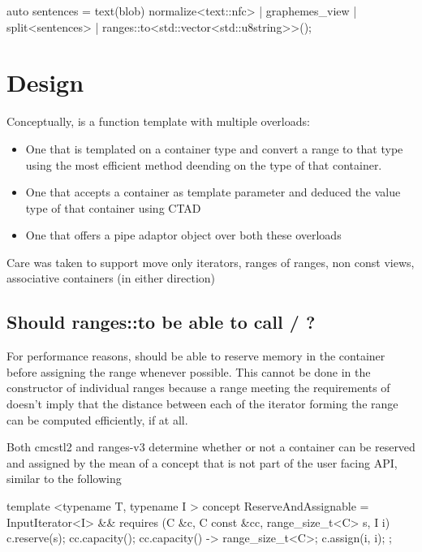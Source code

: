 \documentclass{wg21}
\begin{document}
\begin{colorblock}
    auto sentences =
        text(blob)
        normalize<text::nfc> |
        graphemes_view |
        split<sentences> | ranges::to<std::vector<std::u8string>>();
\end{colorblock}


\section{Design}

Conceptually,  is a function template with multiple overloads:
\begin{itemize}
    \item One that is templated on a container type and convert a range to that type using the most efficient method deending on the type of that container.
    \item One that accepts a container as template parameter and deduced the value type of that container using CTAD
    \item One that offers a pipe adaptor object over both these overloads
\end{itemize}

Care was taken to support move only iterators, ranges of ranges, non const views, associative containers (in either direction)


\subsection{Should ranges::to be able to call / ?}

For performance reasons,  should be able to reserve memory in the container before assigning the range whenever possible.
This cannot be done in the constructor of individual ranges because a range meeting the requirements of  
doesn't imply that the distance between each of the iterator forming the range can be computed efficiently, if at all. 

Both cmcstl2 and ranges-v3 determine whether or not a container can be reserved and assigned by the mean of a  concept that is not part of the user facing API, similar to the following


\begin{colorblock}
template <typename T, typename I >
concept ReserveAndAssignable = 
	InputIterator<I> && requires (C &c, C const &cc, range_size_t<C> s, I i) {
		c.reserve(s);
		cc.capacity();
		{ cc.capacity() } -> range_size_t<C>;
		c.assign(i, i);
};
\end{colorblock}
\end{document}
